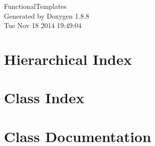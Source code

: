 \documentclass[twoside]{book}
\newcommand{\+}{\discretionary{\mbox{\scriptsize$\hookleftarrow$}}{}{}}
\newcommand{\clearemptydoublepage}{%
  \newpage{\pagestyle{empty}\cleardoublepage}%
}
\begin{document}
\hypersetup{pageanchor=false,
             bookmarks=true,
             bookmarksnumbered=true,
             pdfencoding=unicode
            }
\begin{titlepage}
\vspace*{7cm}
\begin{center}%
{\Large Functional\+Templates }\\
\vspace*{1cm}
{\large Generated by Doxygen 1.8.8}\\
\vspace*{0.5cm}
{\small Tue Nov 18 2014 19:49:04}\\
\end{center}
\end{titlepage}
\clearemptydoublepage
\tableofcontents
\clearemptydoublepage
{}
\hypersetup{pageanchor=true}

\chapter{Hierarchical Index}

\chapter{Class Index}

\chapter{Class Documentation}





































\newpage
{}
{}
\printindex
\end{document}
